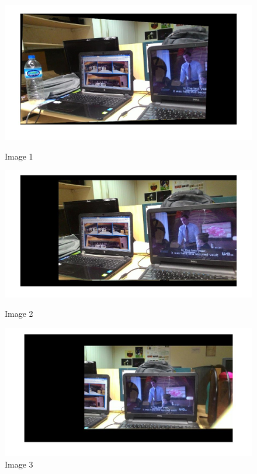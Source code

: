 \documentclass[12pt]{article}
\begin{document}
\begin{figure}[h]
\centering
\begin{minipage}{0.3\textwidth}
\centering
\includegraphics[scale = 0.1]{stitch1.jpg}
\caption{Image 1}
\label{fig:Image 1}
\end{minipage}%
\begin{minipage}{.3\textwidth}
\centering
\includegraphics[scale = 0.1]{stitch2.jpg}
\caption{Image 2}
\label{fig:Image 2}
\end{minipage}%
\begin{minipage}{.3\textwidth}
\centering
\includegraphics[scale = 0.14]{stitch3.jpg}
\caption{Image 3}
\label{fig:Image 2}
\end{minipage}%

\end{figure}
\end{document}
